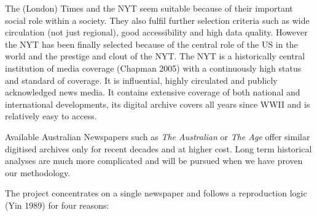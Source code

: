 \documentclass{report}
\begin{document}
The (London) Times and the NYT seem suitable because of their important social role within a society. They also fulfil further selection criteria such as wide circulation (not just regional), good accessibility and high data quality. However the NYT has been finally selected because of the central role of the US in the world and the prestige and clout of the NYT. The NYT is a historically central institution of media coverage (Chapman 2005) with a continuously high status and standard of coverage. It is influential, highly circulated and publicly acknowledged news media. It contains extensive coverage of both national and international developments, its digital archive covers all years since WWII and is relatively easy to access.

Available Australian Newspapers such as \emph{The Australian} or \emph{The Age} offer similar digitised archives only for recent decades and at higher cost. Long term historical analyses are much more complicated and will be pursued when we have proven our methodology.


The project concentrates on a single newspaper and follows a reproduction logic (Yin 1989) for four reasons: 
\end{document}
